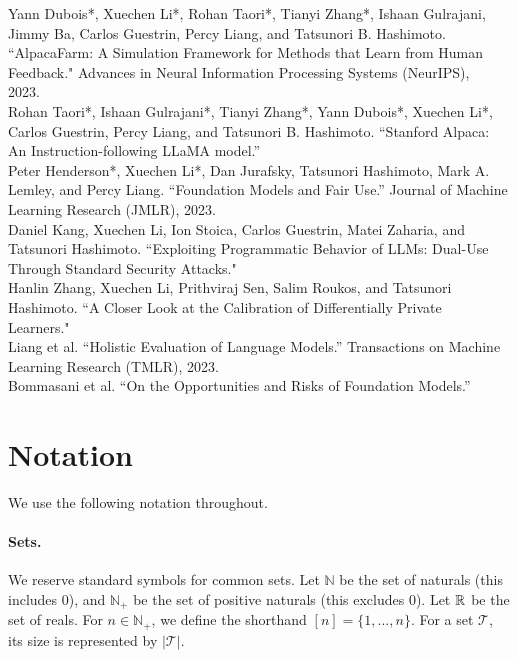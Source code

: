 \begin{verticalline}
Yann Dubois*, Xuechen Li*, Rohan Taori*, Tianyi Zhang*, Ishaan Gulrajani, Jimmy Ba, Carlos Guestrin, Percy Liang, and Tatsunori B. Hashimoto. ``AlpacaFarm: A Simulation Framework for Methods that Learn from Human Feedback."
Advances in Neural Information Processing Systems (NeurIPS), 2023.~\cite{dubois2023alpacafarm}\\

\noindent
Rohan Taori*, Ishaan Gulrajani*, Tianyi Zhang*, Yann Dubois*, Xuechen Li*, Carlos Guestrin, Percy Liang, and Tatsunori B. Hashimoto.
``Stanford Alpaca: An Instruction-following LLaMA model.''~\cite{alpaca}\\

\noindent 
Peter Henderson*, Xuechen Li*, Dan Jurafsky, Tatsunori Hashimoto, Mark A. Lemley, and Percy Liang. 
``Foundation Models and Fair Use.''
Journal of Machine Learning Research (JMLR), 2023.~\cite{henderson2023fairuse}\\

\noindent 
Daniel Kang, Xuechen Li, Ion Stoica, Carlos Guestrin, Matei Zaharia, and Tatsunori Hashimoto. ``Exploiting Programmatic Behavior of LLMs: Dual-Use Through Standard Security Attacks."~\cite{kang2023exploiting}\\

\noindent 
Hanlin Zhang, Xuechen Li, Prithviraj Sen, Salim Roukos, and Tatsunori Hashimoto. 
``A Closer Look at the Calibration of Differentially Private Learners."~\cite{zhang2022closer}\\

\noindent 
Liang et al.
``Holistic Evaluation of Language Models.''
Transactions on Machine Learning Research (TMLR), 2023.~\cite{liang2023holistic}\\


\noindent 
Bommasani et al.
``On the Opportunities and Risks of Foundation Models.''~\cite{bommasani2021opportunities}

\end{verticalline}

\newpage
\section{Notation}
We use the following notation throughout.

\paragraph{Sets.} 
We reserve standard symbols for common sets.
Let $\mathbb{N}$ be the set of naturals (this includes 0), and $\mathbb{N}_+$ be the set of positive naturals (this excludes 0).
Let $\mathbb{R}$ be the set of reals.
For $n \in \mathbb{N}_+$, we define the shorthand $[n] = \{1, . . . , n\}$.
For a set $\mathcal{T}$, its size is represented by $|\mathcal{T}|$.

